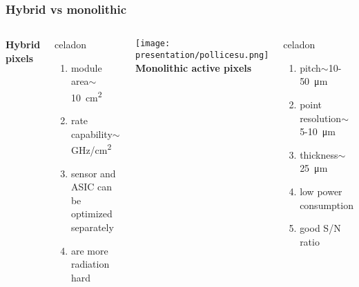     \begin{frame}
        \frametitle{Hybrid vs monolithic}
        \begin{columns}
                \centering\textbf{Hybrid pixels}
                \begin{beamercolorbox}[ rounded=true, center]{celadon}
                    \begin{enumerate}
                        \item module area$\sim$\SI{10}{cm\squared}
                        \item rate capability$\sim$\si{GHz/cm\squared}
                        \item sensor and ASIC can be optimized separately
                        \item are more radiation hard 
                    \end{enumerate} 
                \end{beamercolorbox}
                \texttt{[image: presentation/pollicesu.png]}
                \centering\textbf{Monolithic active pixels}
                \begin{beamercolorbox}[ rounded=true, center]{celadon}
                    \begin{enumerate}
                        \item pitch$\sim$10-\SI{50}{\um}
                        \item point resolution$\sim$5-\SI{10}{\um}
                        \item thickness$\sim$\SI{25}{\um}
                        \item low power consumption
                        \item good S/N ratio
                    \end{enumerate}    
                \end{beamercolorbox}
        \end{columns}
       

\end{frame}
